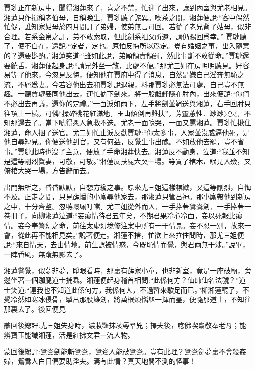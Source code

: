 \begin{parag}
    賈璉正在新房中，聞得湘蓮來了，喜之不禁，忙迎了出來，讓到內室與尤老相見。湘蓮只作揖稱老伯母，自稱晚生，賈璉聽了詫異。喫茶之間，湘蓮便說:“客中偶然忙促，誰知家姑母於四月間訂了弟婦，使弟無言可回。若從了老兄背了姑母，似非合理。若系金帛之訂，弟不敢索取，但此劍系祖父所遺，請仍賜回爲幸。” 賈璉聽了，便不自在，還說:“定者，定也。原怕反悔所以爲定。豈有婚姻之事，出入隨意的？還要斟酌。”湘蓮笑道:“雖如此說，弟願領責領罰，然此事斷不敢從命。”賈璉還要饒舌，湘蓮便起身說:“請兄外坐一敘，此處不便。”那尤三姐在房明明聽見。好容易等了他來，今忽見反悔，便知他在賈府中得了消息，自然是嫌自己淫奔無恥之流，不屑爲妻。今若容他出去和賈璉說退親，料那賈璉必無法可處，自己豈不無趣。一聽賈璉要同他出去，連忙摘下劍來，將一股雌鋒隱在肘內，出來便說:“你們不必出去再議，還你的定禮。”一面淚如雨下，左手將劍並鞘送與湘蓮，右手回肘只往項上一橫。可憐“揉碎桃花紅滿地，玉山傾倒再難扶”，芳靈蕙性，渺渺冥冥，不知那邊去了。當下唬得衆人急救不迭。尤老一面嚎哭，一面又罵湘蓮。賈璉忙揪住湘蓮，命人捆了送官。尤二姐忙止淚反勸賈璉:“你太多事，人家並沒威逼他死，是他自尋短見。你便送他到官，又有何益，反覺生事出醜。不如放他去罷，豈不省事。”賈璉此時也沒了主意，便放了手命湘蓮快去。湘蓮反不動身，泣道:“我並不知是這等剛烈賢妻，可敬，可敬。”湘蓮反扶屍大哭一場。等買了棺木，眼見入殮，又俯棺大哭一場，方告辭而去。
\end{parag}


\begin{parag}
    出門無所之，昏昏默默，自想方纔之事。原來尤三姐這樣標緻，又這等剛烈，自悔不及。正走之間，只見薛蟠的小廝尋他家去，那湘蓮只管出神。那小廝帶他到新房之中，十分齊整。忽聽環珮叮噹，尤三姐從外而入，一手捧著鴛鴦劍，一手捧著一卷冊子，向柳湘蓮泣道:“妾癡情待君五年矣，不期君果冷心冷面，妾以死報此癡情。妾今奉警幻之命，前往太虛幻境修注案中所有一干情鬼。妾不忍一別，故來一會，從此再不能相見矣。”說著便走。湘蓮不捨，忙欲上來拉住問時，那尤三姐便說:“來自情天，去由情地。前生誤被情惑，今既恥情而覺，與君兩無干涉。”說畢，一陣香風，無蹤無影去了。
\end{parag}


\begin{parag}
    湘蓮警覺，似夢非夢，睜眼看時，那裏有薛家小童，也非新室，竟是一座破廟，旁邊坐著一個跏腿道士捕蝨。湘蓮便起身稽首相問:“此係何方？仙師仙名法號？”道士笑道:“連我也不知道此係何方，我係何人，不過暫來歇足而已。”柳湘蓮聽了，不覺冷然如寒冰侵骨，掣出那股雄劍，將萬根煩惱絲一揮而盡，便隨那道士，不知往那裏去了。後回便見
\end{parag}


\begin{parag}
    \begin{note}蒙回後總評:尤三姐失身時，濃妝豔抹凌辱羣兇；擇夫後，唸佛喫齋敬奉老母；能辨寶玉能識湘蓮，活是紅拂文君一流人物。\end{note}
\end{parag}


\begin{parag}
    \begin{note}蒙回後總評:鴛鴦劍能斬鴛鴦，鴛鴦人能破鴛鴦。豈有此理？鴛鴦劍夢裏不會殺姦婦，鴛鴦人白日偏要助淫夫。焉有此情？真天地間不測的怪事！\end{note}
\end{parag}
